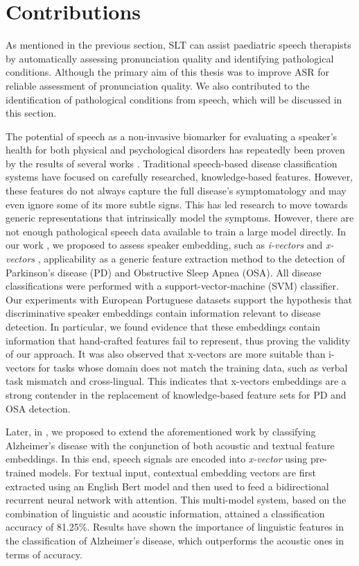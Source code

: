 \section{Contributions}
As mentioned in the previous section, SLT can assist paediatric speech therapists by automatically assessing pronunciation quality and identifying pathological conditions. Although the primary aim of this thesis was to improve ASR for reliable assessment of pronunciation quality. We also contributed to the identification of pathological conditions from speech, which will be discussed in this section. 

The potential of speech as a non-invasive biomarker for evaluating a speaker's health for both physical and psychological disorders has repeatedly been proven by the results of several works  \cite{hauptman2019identifying,botelho2019speech}. Traditional speech-based disease classification systems have focused on carefully researched, knowledge-based features. However, these features do not always capture the full disease's symptomatology and may even ignore some of its more subtle signs. This has led research to move towards generic representations that intrinsically model the symptoms. However, there are not enough pathological speech data available to train a large model directly. In our work \cite{botelho2020pathological}, we proposed to assess speaker embedding, such as \textit{i-vectors} \cite{ivector} and \textit{x-vectors} \cite{snyder2018x}, applicability as a generic feature extraction method to the detection of Parkinson’s disease (PD) and Obstructive Sleep Apnea (OSA). All disease classifications were performed with a support-vector-machine (SVM) classifier. Our experiments with European Portuguese datasets support the hypothesis that discriminative speaker embeddings contain information relevant to disease detection. In particular, we found evidence that these embeddings contain information that hand-crafted features fail to represent, thus proving the validity of our approach. It was also observed that x-vectors are more suitable than i-vectors for tasks whose domain does not match the training data, such as verbal task mismatch and cross-lingual. This indicates that x-vectors embeddings are a strong contender in the replacement of knowledge-based feature sets for PD and OSA detection.

Later, in \cite{pompili2020inesc}, we proposed to extend the aforementioned work by classifying Alzheimer's disease with the conjunction of both acoustic and textual feature embeddings. In this end, speech signals are encoded into \textit{x-vector} using pre-trained models. For textual input, contextual embedding vectors are first extracted using an English Bert model \cite{Bert} and then used to feed a bidirectional recurrent neural network with attention. This multi-model system, based on the combination of linguistic and acoustic information, attained a classification accuracy of 81.25\%. Results have shown the importance of linguistic features in the classification of Alzheimer’s disease, which outperforms the acoustic ones in terms of accuracy.

